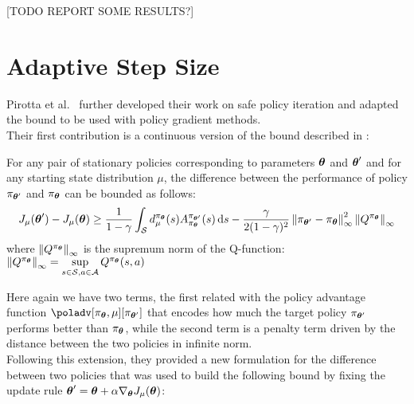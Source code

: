 [TODO REPORT SOME RESULTS?]

\section{Adaptive Step Size}
\label{sec:ass}
Pirotta et al.~\cite{adaptive_step} further developed their work on safe policy iteration and adapted the bound to be used with policy gradient methods.\\
Their first contribution is a continuous version of the bound described in :

\begin{theorem}
For any pair of stationary policies corresponding to parameters $\vtheta$ and $\vtheta'$ and for any starting state distribution $\mu$, the difference between the performance of policy $\pi_{\vtheta'}$ and $\pi_{\vtheta}$ can be bounded as follows:
\[
J_\mu(\vtheta') - J_\mu(\vtheta) \geq \frac{1}{1-\gamma}\int_{\sspace} d_\mu^{\pi_{\vtheta}}(s)A_{\pi_{\vtheta}}^{\pi_{\vtheta'}}(s)\de s - \frac{\gamma}{2(1-\gamma)^2}\norm[\infty]{\pi_{\vtheta'} - \pi_{\vtheta}}^2\norm[\infty]{Q^{\pi_{\vtheta}}}
\]
where $\norm[\infty]{Q^{\pi_{\vtheta}}}$ is the supremum norm of the Q-function: $\norm[\infty]{Q^{\pi_{\vtheta}}}=\sup\limits_{\substack{s\in\sspace, a\in\aspace}}Q^{\pi_{\vtheta}}(s,a)$
\end{theorem}
\newcommand*{\gradj}{\nabla_{\vtheta}J_\mu(\vtheta)}
Here again we have two terms, the first related with the policy advantage function $\poladv[\pi_{\vtheta},\mu][\pi_{\vtheta'}]$ that encodes how much the target policy $\pi_{\vtheta'}$ performs better than $\pi_{\vtheta}$, while the second term is a penalty term driven by the distance between the two policies in infinite norm. \\
Following this extension, they provided a new formulation for the difference between two policies that was used to build the following bound by fixing the update rule $\vtheta' = \vtheta + \alpha \gradj$:

\newcommand*{\pol}[1][]{\pi(a|s, \vtheta #1)}

